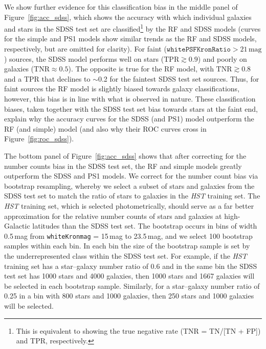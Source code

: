 \documentclass[twocolumn, dvipdfmx]{aastex62}
\begin{document}
We show further evidence for this classification bias in the middle panel of
Figure~\ref{fig:acc_sdss}, which shows the accuracy with which individual
galaxies and stars in the SDSS test set are classified\footnote{This is
equivalent to showing the true negative rate (TNR = TN/[TN + FP]) and TPR,
respectively.} by the RF and SDSS models (curves for the simple and PS1
models show similar trends as the RF and SDSS models, respectively, but are
omitted for clarity). For faint ($\mathtt{whitePSFKronRatio} >
21\,\mathrm{mag}$) sources, the SDSS model performs well on stars
($\mathrm{TPR} \gtrsim 0.9$) and poorly on galaxies ($\mathrm{TNR} \approx
0.5$). The opposite is true for the RF model, with $\mathrm{TNR} \gtrsim
0.8$ and a TPR that declines to $\sim$0.2 for the faintest SDSS test set
sources. Thus, for faint sources the RF model is slightly biased towards
galaxy classifications, however, this bias is in line with what is observed
in nature. These classification biases, taken together with the SDSS test
set bias towards stars at the faint end, explain why the accuracy curves for
the SDSS (and PS1) model outperform the RF (and simple) model (and also why
their ROC curves cross in Figure~\ref{fig:roc_sdss}).

The bottom panel of Figure~\ref{fig:acc_sdss} shows that after correcting
for the number counts bias in the SDSS test set, the RF and simple models
greatly outperform the SDSS and PS1 models. We correct for the number count
bias via bootstrap resampling, whereby we select a subset of stars and
galaxies from the SDSS test set to match the ratio of stars to galaxies in
the \textit{HST} training set. The \textit{HST} training set, which is
selected photometrically, should serve as a far better approximation for the
relative number counts of stars and galaxies at high-Galactic latitudes than
the SDSS test set. The bootstrap occurs in bins of width 0.5\,mag from
\texttt{whiteKronmag} = 15\,mag to 23.5\,mag, and we select 100 bootstrap
samples within each bin. In each bin the size of the bootstrap sample is set
by the underrepresented class within the SDSS test set. For example, if the
\textit{HST} training set has a star--galaxy number ratio of 0.6 and in the
same bin the SDSS test set has 1000 stars and 4000 galaxies, then 1000 stars
and 1667 galaxies will be selected in each bootstrap sample. Similarly, for
a star--galaxy number ratio of 0.25 in a bin with 800 stars and 1000
galaxies, then 250 stars and 1000 galaxies will be selected.
\end{document}
